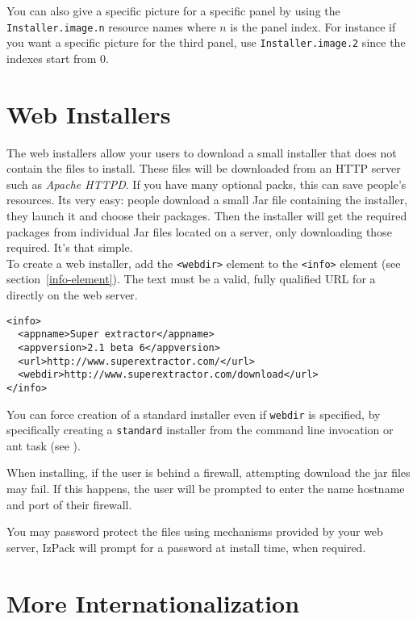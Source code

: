 You can also give a specific picture for a specific panel by using the
\texttt{Installer.image.n} resource names where $n$ is the panel index. For
instance if you want a specific picture for the third panel, use
\texttt{Installer.image.2} since the indexes start from 0.\\

\section{Web Installers}
\label{webinstaller}

The web installers allow your users to download a small installer that
does not contain the files to install. These files will be downloaded
from an HTTP server such as \textit{Apache HTTPD}. If you have many
optional packs, this can save people's resources. Its very easy:
people download a small Jar file containing the installer, they launch
it and choose their packages. Then the installer will get the required
packages from individual Jar files located on a server, only
downloading those required. It's that simple.\\

To create a web installer, add the \texttt{<webdir>} element to the
\texttt{<info>} element (see section~\ref{info-element}). The text must
be a valid, fully qualified URL for a directly on the web server.\\

\footnotesize
\begin{verbatim}
<info>
  <appname>Super extractor</appname>
  <appversion>2.1 beta 6</appversion>
  <url>http://www.superextractor.com/</url>
  <webdir>http://www.superextractor.com/download</url>
</info>
\end{verbatim}
\normalsize

You can force creation of a standard installer even if \texttt{webdir}
is specified, by specifically creating a \texttt{standard} installer
from the command line invocation or ant task (see
\label{ant-integration}).

When installing, if the user is behind a firewall, attempting download
the jar files may fail. If this happens, the user will be prompted to
enter the name hostname and port of their firewall.

You may password protect the files using mechanisms provided by your
web server, IzPack will prompt for a password at install time, when
required.

\section{More Internationalization}

